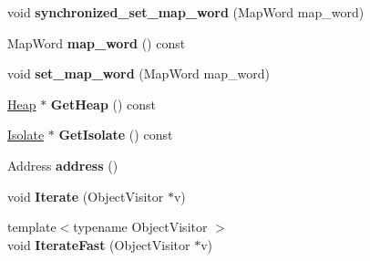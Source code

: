 \begin{DoxyCompactItemize}
\item 
void {\bfseries synchronized\+\_\+set\+\_\+map\+\_\+word} (Map\+Word map\+\_\+word)\hypertarget{classv8_1_1internal_1_1_heap_object_a5a925ad87d656bf9a6f714b1d1ac6a49}{}\label{classv8_1_1internal_1_1_heap_object_a5a925ad87d656bf9a6f714b1d1ac6a49}

\item 
Map\+Word {\bfseries map\+\_\+word} () const \hypertarget{classv8_1_1internal_1_1_heap_object_a33d0b5f67639225d2f3072001c181864}{}\label{classv8_1_1internal_1_1_heap_object_a33d0b5f67639225d2f3072001c181864}

\item 
void {\bfseries set\+\_\+map\+\_\+word} (Map\+Word map\+\_\+word)\hypertarget{classv8_1_1internal_1_1_heap_object_ac765f37bdbe72ec7ebf00483cfa1c8d5}{}\label{classv8_1_1internal_1_1_heap_object_ac765f37bdbe72ec7ebf00483cfa1c8d5}

\item 
\hyperlink{classv8_1_1internal_1_1_heap}{Heap} $\ast$ {\bfseries Get\+Heap} () const \hypertarget{classv8_1_1internal_1_1_heap_object_a8a7809cf288fc0097bfa232ce62a696e}{}\label{classv8_1_1internal_1_1_heap_object_a8a7809cf288fc0097bfa232ce62a696e}

\item 
\hyperlink{classv8_1_1internal_1_1_isolate}{Isolate} $\ast$ {\bfseries Get\+Isolate} () const \hypertarget{classv8_1_1internal_1_1_heap_object_a844af926eaabef23dd65185c3c51f978}{}\label{classv8_1_1internal_1_1_heap_object_a844af926eaabef23dd65185c3c51f978}

\item 
Address {\bfseries address} ()\hypertarget{classv8_1_1internal_1_1_heap_object_a6969394bb5c9119fd1a23ec6bedda74d}{}\label{classv8_1_1internal_1_1_heap_object_a6969394bb5c9119fd1a23ec6bedda74d}

\item 
void {\bfseries Iterate} (Object\+Visitor $\ast$v)\hypertarget{classv8_1_1internal_1_1_heap_object_ad87e32c09e00dd3f4470bbb4db518968}{}\label{classv8_1_1internal_1_1_heap_object_ad87e32c09e00dd3f4470bbb4db518968}

\item 
{\footnotesize template$<$typename Object\+Visitor $>$ }\\void {\bfseries Iterate\+Fast} (Object\+Visitor $\ast$v)\hypertarget{classv8_1_1internal_1_1_heap_object_afaa4602f1708e33792afa37ad4b165ec}{}\label{classv8_1_1internal_1_1_heap_object_afaa4602f1708e33792afa37ad4b165ec}


\end{DoxyCompactItemize}
